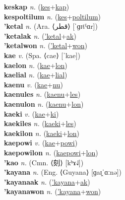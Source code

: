 \textbf{keskap} \textit{n.} (\hyperref[kes]{kes}+\hyperref[kap]{kap})
 \label{keskap} \\
\textbf{kespoltilum} \textit{n.} (\hyperref[kes]{kes}+\hyperref[poltilum]{poltilum})
 \label{kespoltilum} \\
\textbf{'ketal} \textit{n.} (Ara. ⟨قطر‎⟩ [ˈɡɪtˤɑr])
 \label{'ketal} \\
\textbf{'ketalak} \textit{n.} (\hyperref['ketal]{'ketal}+\hyperref[ak]{ak})
 \label{'ketalak} \\
\textbf{'ketalwon} \textit{n.} (\hyperref['ketal]{'ketal}+\hyperref[won]{won})
 \label{'ketalwon} \\
\textbf{kae} \textit{v.} (Spa. ⟨cae⟩ [ˈkae])
 \label{kae} \\
\textbf{kaelon} \textit{n.} (\hyperref[kae]{kae}+\hyperref[lon]{lon})
 \label{kaelon} \\
\textbf{kaelial} \textit{n.} (\hyperref[kae]{kae}+\hyperref[lial]{lial})
 \label{kaelial} \\
\textbf{kaenu} \textit{v.} (\hyperref[kae]{kae}+\hyperref[nu]{nu})
 \label{kaenu} \\
\textbf{kaenules} \textit{n.} (\hyperref[kaenu]{kaenu}+\hyperref[les]{les})
 \label{kaenules} \\
\textbf{kaenulon} \textit{n.} (\hyperref[kaenu]{kaenu}+\hyperref[lon]{lon})
 \label{kaenulon} \\
\textbf{kaeki} \textit{v.} (\hyperref[kae]{kae}+\hyperref[ki]{ki})
 \label{kaeki} \\
\textbf{kaekiles} \textit{n.} (\hyperref[kaeki]{kaeki}+\hyperref[les]{les})
 \label{kaekiles} \\
\textbf{kaekilon} \textit{n.} (\hyperref[kaeki]{kaeki}+\hyperref[lon]{lon})
 \label{kaekilon} \\
\textbf{kaepowi} \textit{v.} (\hyperref[kae]{kae}+\hyperref[powi]{powi})
 \label{kaepowi} \\
\textbf{kaepowilon} \textit{n.} (\hyperref[kaepowi]{kaepowi}+\hyperref[lon]{lon})
 \label{kaepowilon} \\
\textbf{'kao} \textit{n.} (Cmn. ⟨刻⟩ [kʰɤ˨˩])
 \label{'kao} \\
\textbf{'kayana} \textit{n.} (Eng. ⟨Guyana⟩ [ɡaɪ̯ˈɑːnə])
 \label{'kayana} \\
\textbf{'kayanaak} \textit{n.} (\hyperref['kayana]{'kayana}+\hyperref[ak]{ak})
 \label{'kayanaak} \\
\textbf{'kayanawon} \textit{n.} (\hyperref['kayana]{'kayana}+\hyperref[won]{won})
 \label{'kayanawon} \\
